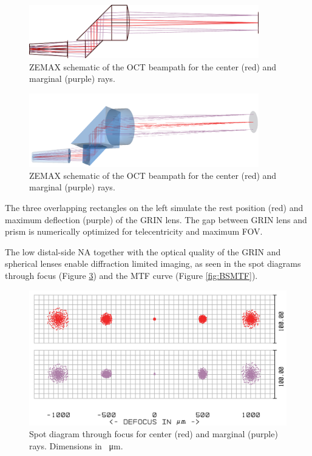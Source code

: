 \begin{figure}[h!]\centering
      \includegraphics[width=10cm]{figures/30_DesignSimulation/Optical/beamsplitter.pdf}
      \caption{ZEMAX schematic of the OCT beampath for the center (red) and marginal (purple) rays.}
      \label{fig:BS}
\end{figure}

\begin{figure}[h!]\centering
      \includegraphics[width=10cm]{figures/30_DesignSimulation/Optical/beamsplitter3D.png}
      \caption{ZEMAX schematic of the OCT beampath for the center (red) and marginal (purple) rays.}
      \label{fig:BS}
\end{figure}

The three overlapping rectangles on the left simulate the rest position (red) and maximum deflection (purple) of the GRIN lens. The gap between GRIN lens and prism is numerically optimized for telecentricity and maximum FOV.

	The low distal-side NA together with the optical quality of the GRIN and spherical lenses enable diffraction limited imaging, as seen in the spot diagrams through focus (Figure \ref{fig:BSspot}) and the MTF curve (Figure \ref{fig:BSMTF}).
	
\begin{figure}[h!]\centering
      \includegraphics{figures/30_DesignSimulation/Optical/beamsplitterSpot.png}
      \caption{Spot diagram through focus for center (red) and marginal (purple) rays. Dimensions in \SI{}{\micro\meter}.}
      \label{fig:BSspot}
\end{figure}

